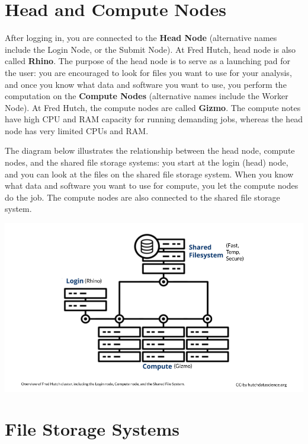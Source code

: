 \documentclass[
]{book}
\begin{document}
\hypertarget{head-and-compute-nodes}{%
\section{Head and Compute Nodes}\label{head-and-compute-nodes}}

After logging in, you are connected to the \textbf{Head Node} (alternative names include the Login Node, or the Submit Node). At Fred Hutch, head node is also called \textbf{Rhino}. The purpose of the head node is to serve as a launching pad for the user: you are encouraged to look for files you want to use for your analysis, and once you know what data and software you want to use, you perform the computation on the \textbf{Compute Nodes} (alternative names include the Worker Node). At Fred Hutch, the compute nodes are called \textbf{Gizmo}. The compute notes have high CPU and RAM capacity for running demanding jobs, whereas the head node has very limited CPUs and RAM.

The diagram below illustrates the relationship between the head node, compute nodes, and the shared file storage systems: you start at the login (head) node, and you can look at the files on the shared file storage system. When you know what data and software you want to use for compute, you let the compute nodes do the job. The compute nodes are also connected to the shared file storage system.

\begin{center}\includegraphics[width=0.8\linewidth]{resources/images/05-look-around_files/figure-latex//1BQxrVYdKZTbpCaF-i_q9w7s9x034lEXpQZDU-Sl09cs_g3149434dbb4_1_3} \end{center}

\hypertarget{file-storage-systems}{%
\section{File Storage Systems}\label{file-storage-systems}}
\end{document}
